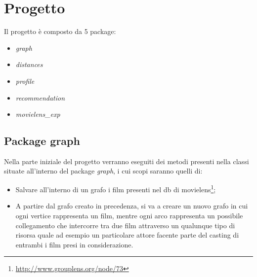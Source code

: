 \section{Progetto}
\label{project}

Il progetto è composto da 5 package:
\begin{itemize}
\item\emph{graph}
\item\emph{distances}
\item\emph{profile}
\item\emph{recommendation}
\item\emph{movielens\_exp}
\end{itemize}

\subsection{Package graph}
Nella parte iniziale del progetto verranno eseguiti dei metodi presenti nella classi situate all'interno del package \emph{graph}, i cui scopi saranno quelli di:
\begin{itemize}
\item Salvare all'interno di un grafo i film presenti nel db di movielens\footnote{\url{http://www.grouplens.org/node/73}};
\item A partire dal grafo creato in precedenza, si va a creare un nuovo grafo in cui ogni vertice rappresenta un film, mentre ogni arco rappresenta un possibile collegamento che intercorre tra due film attraverso un qualunque tipo di risorsa quale ad esempio un particolare attore facente parte del casting di entrambi i film presi in considerazione.
\end{itemize}
